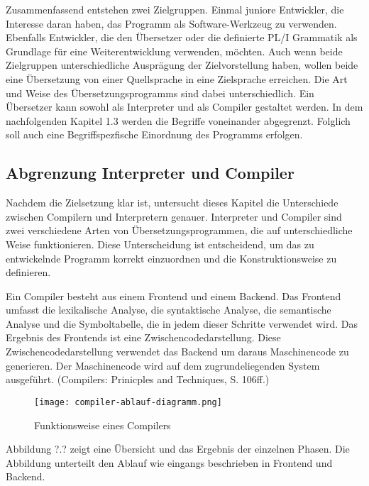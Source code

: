 Zusammenfassend entstehen zwei Zielgruppen. Einmal juniore Entwickler, die Interesse daran haben, das Programm als Software-Werkzeug zu verwenden. Ebenfalls Entwickler, die den Übersetzer oder die definierte PL/I Grammatik als Grundlage für eine Weiterentwicklung verwenden, möchten. 
Auch wenn beide Zielgruppen unterschiedliche Ausprägung der Zielvorstellung haben, wollen beide eine Übersetzung von einer Quellsprache in eine Zielsprache erreichen. Die Art und Weise des Übersetzungsprogramms sind dabei unterschiedlich. Ein Übersetzer kann sowohl als Interpreter und als Compiler gestaltet werden. In dem nachfolgenden Kapitel 1.3 werden die Begriffe voneinander abgegrenzt. Folglich soll auch eine Begriffspezfische Einordnung des Programms erfolgen.
	
%
	
 
    \pagebreak

\subsection{Abgrenzung Interpreter und Compiler}
Nachdem die Zielsetzung klar ist, untersucht dieses Kapitel die Unterschiede zwischen Compilern und Interpretern genauer. Interpreter und Compiler sind zwei verschiedene Arten von Übersetzungsprogrammen, die auf unterschiedliche Weise funktionieren. Diese Unterscheidung ist entscheidend, um das zu entwickelnde Programm korrekt einzuordnen und die Konstruktionsweise zu definieren.
  
Ein Compiler besteht aus einem Frontend und einem Backend. Das Frontend umfasst die lexikalische Analyse, die syntaktische Analyse, die semantische Analyse und die Symboltabelle, die in jedem dieser Schritte verwendet wird. 
Das Ergebnis des Frontends ist eine Zwischencodedarstellung. Diese Zwischencodedarstellung verwendet das Backend um daraus Maschinencode zu generieren. Der Maschinencode wird auf dem zugrundeliegenden System ausgeführt. (Compilers: Prinicples and Techniques, S. 106ff.)
\pagebreak
\begin{figure}[h]
  \centering
  \caption{Funktionsweise eines Compilers}
  \texttt{[image: compiler-ablauf-diagramm.png]}
  \label{fig:compiler}
\end{figure}
\pagebreak
Abbildung ?.? zeigt eine Übersicht und das Ergebnis der einzelnen Phasen. Die Abbildung unterteilt den Ablauf wie eingangs beschrieben in Frontend und Backend.

